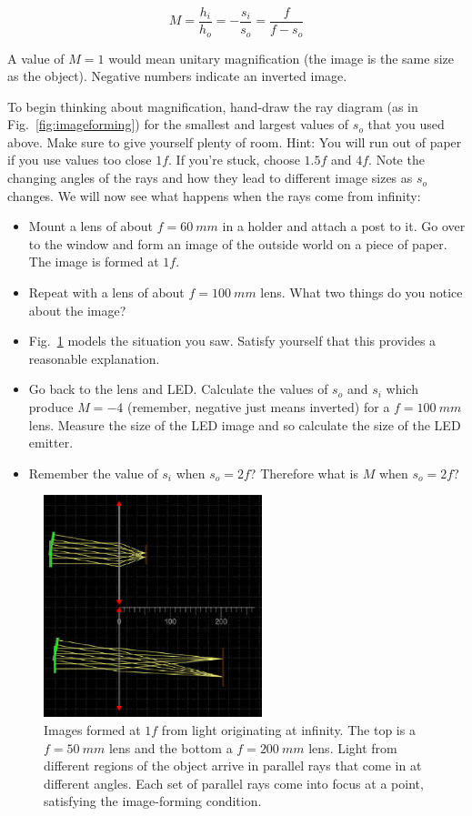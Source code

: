 \documentclass[a4paper]{report}
\begin{document}
\begin{equation}
M = \frac{h_i}{h_o} = -\frac{s_i}{s_o} = \frac{f}{f-s_o}
\label{eq:mag}
\end{equation}

A value of $M=1$ would mean unitary magnification (the image is the same size as the object). 
Negative numbers indicate an inverted image.

To begin thinking about magnification, hand-draw the ray diagram (as in Fig.~\ref{fig:imageforming}) for the smallest and largest values of $s_o$ that you used above. 
Make sure to give yourself plenty of room. 
Hint: You will run out of paper if you use values too close $1f$.
If you're stuck, choose $1.5f$ and $4f$.
Note the changing angles of the rays and how they lead to different image sizes as $s_o$ changes. 
We will now see what happens when the rays come from infinity:

\begin{itemize}
\item Mount a lens of about $f=60~mm$ in a holder and attach a post to it. 
Go over to the window and form an image of the outside world on a piece of paper. 
The image is formed at $1f$.
\item Repeat with a lens of about $f=100~mm$ lens. 
What two things do you notice about the image? 
\item Fig.~\ref{fig:outside} models the situation you saw. Satisfy yourself that this provides a reasonable explanation. 
\item Go back to the lens and LED.
Calculate the values of $s_o$ and $s_i$ which produce $M=-4$ (remember, negative just means inverted) for a $f=100~mm$ lens. 
Measure the size of the LED image and so calculate the size of the LED emitter. 
\item Remember the value of $s_i$ when $s_o=2f$? Therefore what is $M$ when $s_o=2f$?
\end{itemize}


\begin{figure}[h]
\center
\includegraphics[width=2.5in]{image_forming_outside.eps}
\caption{Images formed at $1f$ from light originating at infinity. 
The top is a $f=50~mm$ lens and the bottom a $f=200~mm$ lens.
Light from different regions of the object arrive in parallel rays that come in at different angles. 
Each set of parallel rays come into focus at a point, satisfying the image-forming condition. }
\label{fig:outside}
\end{figure}
\end{document}

